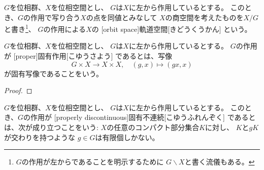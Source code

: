 \documentclass[report]{jlreq}
\begin{document}
\begin{definition}[軌道空間]
    $G$を位相群、$X$を位相空間とし、
    $G$は$X$に左から作用しているとする。
    このとき、$G$の作用で写り合う$X$の点を同値とみなして
    $X$の商空間を考えたものを$X / G$と書き\footnote{
        $G$の作用が左からであることを明示するために
        $G \backslash X$と書く流儀もある。
    }、
    $G$の作用による$X$の
    [orbit space]{軌道空間}[きどうくうかん]
    という。
\end{definition}

\begin{proposition}[軌道空間への商写像は開写像]
    \TODO{}
\end{proposition}

\begin{definition}[固有作用]
    $G$を位相群、$X$を位相空間とし、
    $G$は$X$に左から作用しているとする。
    $G$の作用が
    [proper]{固有作用}[こゆうさよう]
    であるとは、写像
    \begin{equation}
        G \times X \to X \times X,
        \quad
        (g, x) \mapsto (gx, x)
    \end{equation}
    が固有写像であることをいう。
\end{definition}


\begin{proof}
    \TODO{}
\end{proof}


\begin{definition}[固有不連続]
    $G$を位相群、$X$を位相空間とし、
    $G$は$X$に左から作用しているとする。
    このとき、$G$の作用が
    [properly discontinuous]{固有不連続}[こゆうふれんぞく]
    であるとは、次が成り立つことをいう:
    $X$の任意のコンパクト部分集合$K$に対し、
    $K$と$gK$が交わりを持つような
    $g \in G$は有限個しかない。
\end{definition}
\end{document}
